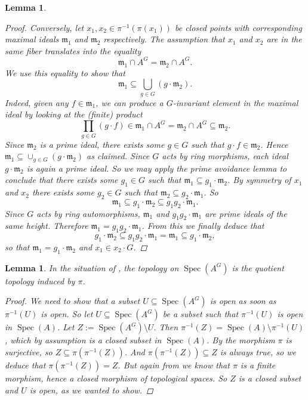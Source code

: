 \documentclass[12pt,a4paper]{amsart}
\theoremstyle{plain}
\newtheorem{lm}[thm]{Lemma}
\theoremstyle{definition}
\theoremstyle{remark}
\begin{document}
\begin{lm}
\begin{proof}
    Conversely, let $x_{1}, x_{2} \in \pi^{-1}(\pi(x_{1}))$ be closed points with corresponding maximal ideals $\mathfrak{m}_{1}$ and $\mathfrak{m}_{2}$ respectively.
    The assumption that $x_{1}$ and $x_{2}$ are in the same fiber translates into the equality
    \[ \mathfrak{m}_{1} \cap A^{G} = \mathfrak{m}_{2} \cap A^{G}. \]
    We use this equality to show that
    \[ \mathfrak{m}_{1} \subseteq \bigcup_{g \in G} (g \cdot \mathfrak{m}_{2}). \]
    Indeed, given any $f \in \mathfrak{m}_{1}$, we can produce a $G$-invariant element in the maximal ideal by looking at the (finite) product
    \[ \prod_{g \in G} (g \cdot f) \in \mathfrak{m}_{1} \cap A^{G} = \mathfrak{m}_{2} \cap A^{G} \subseteq \mathfrak{m}_{2}. \]
    Since $\mathfrak{m}_{2}$ is a prime ideal, there exists some $g \in G$ such that $g \cdot f \in \mathfrak{m}_{2}$.
    Hence $\mathfrak{m}_{1} \subseteq \cup_{g \in G} (g \cdot \mathfrak{m}_{2})$ as claimed.
    Since $G$ acts by ring morphisms, each ideal $g \cdot \mathfrak{m}_{2}$ is again a prime ideal.
    So we may apply the prime avoidance lemma to conclude that there exists some $g_{1} \in G$ such that $\mathfrak{m}_{1} \subseteq g_{1} \cdot \mathfrak{m}_{2}$.
    By symmetry of $x_{1}$ and $x_{2}$ there exists some $g_{2} \in G$ such that $\mathfrak{m}_{2} \subseteq g_{2} \cdot \mathfrak{m}_{1}$.
    So
    \[ \mathfrak{m}_{1} \subseteq g_{1} \cdot \mathfrak{m}_{2} \subseteq g_{1} g_{2} \cdot \mathfrak{m}_{1}. \]
    Since $G$ acts by ring automorphisms, $\mathfrak{m}_{1}$ and $g_{1} g_{2} \cdot \mathfrak{m}_{1}$ are prime ideals of the same height.
    Therefore $\mathfrak{m}_{1} = g_{1} g_{2} \cdot \mathfrak{m}_{1}$.
    From this we finally deduce that
    \[ g_{1} \cdot \mathfrak{m}_{2} \subseteq g_{1}g_{2} \cdot \mathfrak{m}_{1} = \mathfrak{m}_{1} \subseteq g_{1} \cdot \mathfrak{m}_{2}, \]
    so that $\mathfrak{m}_{1} = g_{1} \cdot \mathfrak{m}_{2}$ and $x_{1} \in x_{2} \cdot G$.
  \end{proof}
\end{lm}

\begin{lm}\label{lm:topology}
  In the situation of , the topology on $\operatorname{Spec}(A^{G})$ is the quotient topology induced by $\pi$.
  
  \begin{proof}
    We need to show that a subset $U \subseteq \operatorname{Spec}(A^{G})$ is open as soon as $\pi^{-1}(U)$ is open.
    So let $U \subseteq \operatorname{Spec}(A^{G})$ be a subset such that $\pi^{-1}(U)$ is open in $\operatorname{Spec}(A)$.
    Let $Z := \operatorname{Spec}(A^{G}) \setminus U$.
    Then $\pi^{-1}(Z) = \operatorname{Spec}(A) \setminus \pi^{-1}(U)$, which by assumption is a closed subset in $\operatorname{Spec}(A)$.
    By  the morphism $\pi$ is surjective, so $Z \subseteq \pi(\pi^{-1}(Z))$.
    And $\pi(\pi^{-1}(Z)) \subseteq Z$ is always true, so we deduce that $\pi(\pi^{-1}(Z)) = Z$.
    But again from  we know that $\pi$ is a finite morphism, hence a closed morphism of topological spaces.
    So $Z$ is a closed subset and $U$ is open, as we wanted to show.
  \end{proof}
\end{lm}
\end{document}
